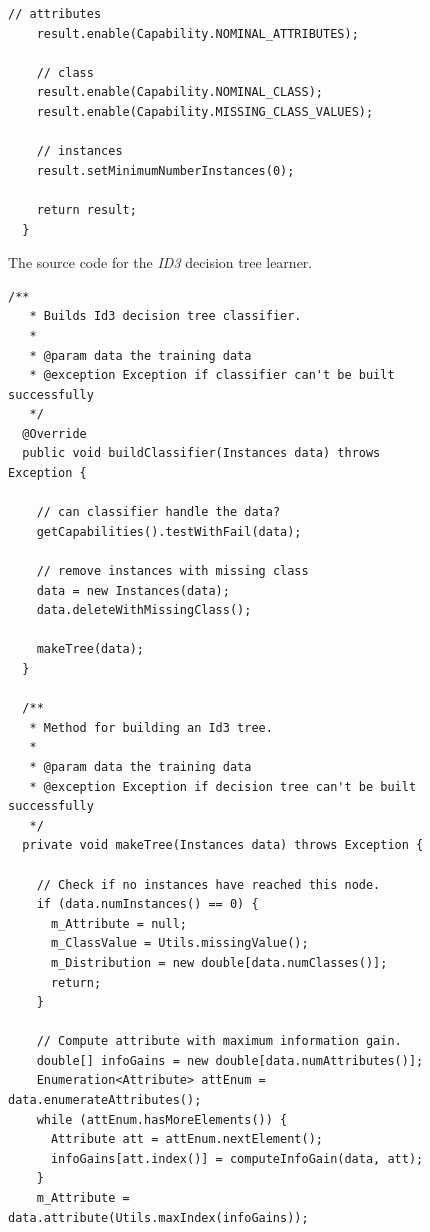 \begin{figure}[!thp]
\begin{mdframed}[innermargin=-1cm]
\begin{Verbatim}[fontsize=\scriptsize]
    // attributes
    result.enable(Capability.NOMINAL_ATTRIBUTES);

    // class
    result.enable(Capability.NOMINAL_CLASS);
    result.enable(Capability.MISSING_CLASS_VALUES);

    // instances
    result.setMinimumNumberInstances(0);

    return result;
  }
\end{Verbatim}
\end{mdframed}
\caption{\label{fig:scheme_id3}The source code for the \textit{ID3} decision tree learner.}
\end{figure}

\begin{figure}[!thp]
\ContinuedFloat
\begin{mdframed}[innermargin=-1cm]
\begin{Verbatim}[fontsize=\scriptsize]
  /**
   * Builds Id3 decision tree classifier.
   * 
   * @param data the training data
   * @exception Exception if classifier can't be built successfully
   */
  @Override
  public void buildClassifier(Instances data) throws Exception {

    // can classifier handle the data?
    getCapabilities().testWithFail(data);

    // remove instances with missing class
    data = new Instances(data);
    data.deleteWithMissingClass();

    makeTree(data);
  }

  /**
   * Method for building an Id3 tree.
   * 
   * @param data the training data
   * @exception Exception if decision tree can't be built successfully
   */
  private void makeTree(Instances data) throws Exception {

    // Check if no instances have reached this node.
    if (data.numInstances() == 0) {
      m_Attribute = null;
      m_ClassValue = Utils.missingValue();
      m_Distribution = new double[data.numClasses()];
      return;
    }

    // Compute attribute with maximum information gain.
    double[] infoGains = new double[data.numAttributes()];
    Enumeration<Attribute> attEnum = data.enumerateAttributes();
    while (attEnum.hasMoreElements()) {
      Attribute att = attEnum.nextElement();
      infoGains[att.index()] = computeInfoGain(data, att);
    }
    m_Attribute = data.attribute(Utils.maxIndex(infoGains));


\end{Verbatim}
\end{mdframed}
\end{figure}

